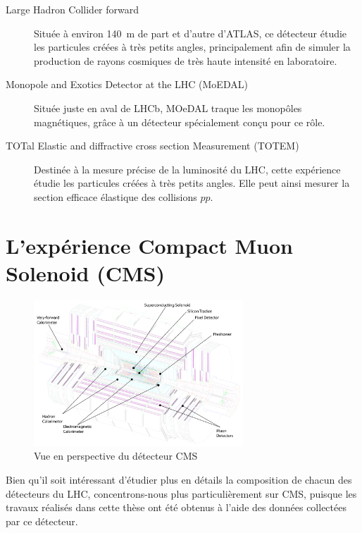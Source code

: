 \begin{description}
  \item[Large Hadron Collider forward] Située à environ \SI{140}{\m} de part et d'autre d'ATLAS, ce détecteur étudie les particules créées à très petits angles, principalement afin de simuler la production de rayons cosmiques de très haute intensité en laboratoire.
  \item[Monopole and Exotics Detector at the LHC (MoEDAL)] Située juste en aval de LHCb, MOeDAL traque les monopôles magnétiques, grâce à un détecteur spécialement conçu pour ce rôle.
  \item[TOTal Elastic and diffractive cross section Measurement (TOTEM)] Destinée à la mesure précise de la luminosité du LHC, cette expérience étudie les particules créées à très petits angles. Elle peut ainsi mesurer la section efficace élastique des collisions $pp$.
\end{description}

% 

\section{L'expérience Compact Muon Solenoid (CMS)} \label{sec:cms}

\begin{figure} \centering
  \includegraphics[width=0.7\textwidth]{chapitre2/figs/CMS_2.pdf}
  \caption{Vue en perspective du détecteur CMS}
  \label{fig:cms}
\end{figure}

Bien qu'il soit intéressant d'étudier plus en détails la composition de chacun des détecteurs du LHC, concentrons-nous plus particulièrement sur CMS, puisque les travaux réalisés dans cette thèse ont été obtenus à l'aide des données collectées par ce détecteur.

